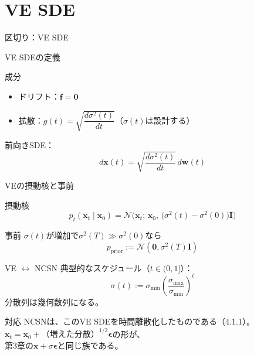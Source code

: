 \section{VE SDE}
\asmain
\begin{frame}{区切り：VE SDE}
    \tableofcontents[currentsection]
\end{frame}
\asmain
\begin{frame}{VE SDEの定義}
    \begin{block}{成分}
        \begin{itemize}
            \item ドリフト：$\bm{f}=\bm{0}$
            \item 拡散：$g(t)=\sqrt{\dfrac{d\sigma^{2}(t)}{dt}}$（$\sigma(t)$は設計する）
        \end{itemize}
    \end{block}
    前向きSDE：
    \[
        d\bm{x}(t)
        =
        \sqrt{\dfrac{d\sigma^{2}(t)}{dt}}\,
        d\bm{w}(t)
        \tag{4.4.1}
    \]
\end{frame}
\asmain
\begin{frame}{VEの摂動核と事前}
    \begin{block}{摂動核}
        \[
            p_t(\bm{x}_t\mid\bm{x}_0)
            =
            \mathcal{N}\!\bigl(
                \bm{x}_t;\,
                \bm{x}_0,\,
                \bigl(\sigma^{2}(t)-\sigma^{2}(0)\bigr)\bm{I}
            \bigr)
        \]
    \end{block}
    \begin{block}{事前}
        $\sigma(t)$が増加で$\sigma^{2}(T)\gg\sigma^{2}(0)$なら
        \[
            p_{\mathrm{prior}}
            :=
            \mathcal{N}(\bm{0},\sigma^{2}(T)\bm{I})
        \]
    \end{block}
\end{frame}
\asmain
\begin{frame}{VE $\leftrightarrow$ NCSN}
    典型的なスケジュール（$t\in(0,1]$）：
    \[
        \sigma(t)
        :=
        \sigma_{\min}
        \left(\dfrac{\sigma_{\max}}{\sigma_{\min}}\right)^{t}
    \]
    分散列は幾何数列になる。
    \begin{block}{対応}
        NCSNは、このVE SDEを時間離散化したものである（4.1.1）。\\
        $\bm{x}_t=\bm{x}_0+\text{（増えた分散）}^{1/2}\bm{\epsilon}$の形が、\\
        第3章の$\bm{x}+\sigma\bm{\epsilon}$と同じ族である。
    \end{block}
\end{frame}
